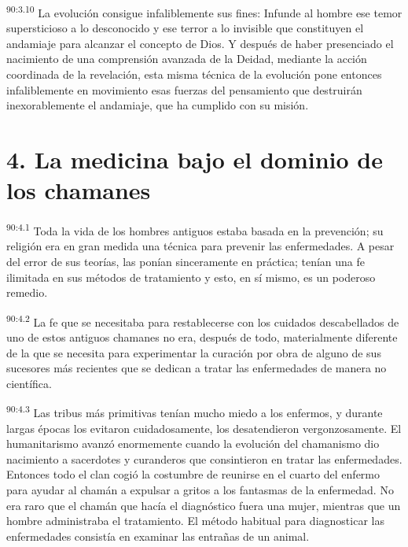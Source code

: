 \par
\textsuperscript{90:3.10} La evolución consigue infaliblemente sus fines: Infunde al hombre ese temor supersticioso a lo desconocido y ese terror a lo invisible que constituyen el andamiaje para alcanzar el concepto de Dios. Y después de haber presenciado el nacimiento de una comprensión avanzada de la Deidad, mediante la acción coordinada de la revelación, esta misma técnica de la evolución pone entonces infaliblemente en movimiento esas fuerzas del pensamiento que destruirán inexorablemente el andamiaje, que ha cumplido con su misión.

\section*{4. La medicina bajo el dominio de los chamanes}
\par
\textsuperscript{90:4.1} Toda la vida de los hombres antiguos estaba basada en la prevención; su religión era en gran medida una técnica para prevenir las enfermedades. A pesar del error de sus teorías, las ponían sinceramente en práctica; tenían una fe ilimitada en sus métodos de tratamiento y esto, en sí mismo, es un poderoso remedio.

\par
\textsuperscript{90:4.2} La fe que se necesitaba para restablecerse con los cuidados descabellados de uno de estos antiguos chamanes no era, después de todo, materialmente diferente de la que se necesita para experimentar la curación por obra de alguno de sus sucesores más recientes que se dedican a tratar las enfermedades de manera no científica.

\par
\textsuperscript{90:4.3} Las tribus más primitivas tenían mucho miedo a los enfermos, y durante largas épocas los evitaron cuidadosamente, los desatendieron vergonzosamente. El humanitarismo avanzó enormemente cuando la evolución del chamanismo dio nacimiento a sacerdotes y curanderos que consintieron en tratar las enfermedades. Entonces todo el clan cogió la costumbre de reunirse en el cuarto del enfermo para ayudar al chamán a expulsar a gritos a los fantasmas de la enfermedad. No era raro que el chamán que hacía el diagnóstico fuera una mujer, mientras que un hombre administraba el tratamiento. El método habitual para diagnosticar las enfermedades consistía en examinar las entrañas de un animal.

